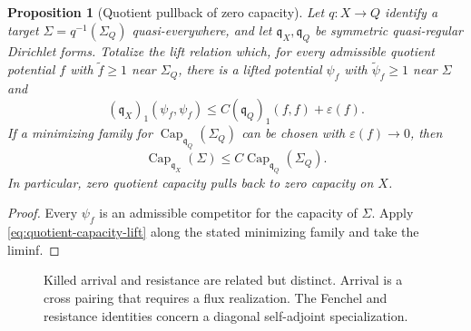 \documentclass[11pt]{article}
\numberwithin{section}{part}
\theoremstyle{plain}
\newtheorem{proposition}[proposition]{Proposition}
\theoremstyle{definition}
\theoremstyle{remark}
\newcommand{\Capacity}{\operatorname{Cap}}
\begin{document}
\begin{proposition}[Quotient pullback of zero capacity]
\label{prop:quotient-capacity-pullback}
Let \(q:X\to Q\) identify a target
\(\Sigma=q^{-1}(\Sigma_Q)\) quasi-everywhere, and let
\(\mathfrak q_X,\mathfrak q_Q\) be symmetric quasi-regular Dirichlet forms.
Totalize the lift relation which, for every admissible quotient potential \(f\)
with
\(\widetilde f\ge1\) near \(\Sigma_Q\), there is a lifted potential \(\psi_f\)
with \(\widetilde\psi_f\ge1\) near \(\Sigma\) and
\begin{equation}
 \label{eq:quotient-capacity-lift}
 (\mathfrak q_X)_1(\psi_f,\psi_f)
 \le C(\mathfrak q_Q)_1(f,f)+\varepsilon(f).
\end{equation}
If a minimizing family for \(\Capacity_{\mathfrak q_Q}(\Sigma_Q)\) can be
chosen with \(\varepsilon(f)\to0\), then
\begin{equation}
 \label{eq:quotient-capacity-bound}
 \Capacity_{\mathfrak q_X}(\Sigma)
 \le C\Capacity_{\mathfrak q_Q}(\Sigma_Q).
\end{equation}
In particular, zero quotient capacity pulls back to zero capacity on \(X\).
\end{proposition}

\begin{proof}
Every \(\psi_f\) is an admissible competitor for the capacity of \(\Sigma\).
Apply \eqref{eq:quotient-capacity-lift} along the stated minimizing family and
take the liminf.
\end{proof}

\begin{figure}[tbp]
\centering
{}
\caption{Killed arrival and resistance are related but distinct.  Arrival is
a cross pairing that requires a flux realization.  The Fenchel and resistance
identities concern a diagonal self-adjoint specialization.}
\label{fig:killed-resolvent-resistance}
\end{figure}
\end{document}
